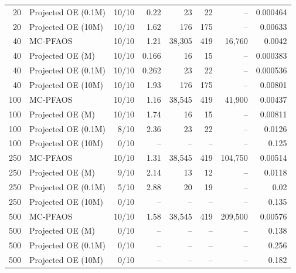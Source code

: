 \begin{table}[!htbp]
\begin{tabular}{r l r r r r r r}
20 & Projected OE (0.1M) & 10/10 & 0.22 & 23 & 22 & -- & 0.000464 \\
20 & Projected OE (10M) & 10/10 & 1.62 & 176 & 175 & -- & 0.00633 \\
\hline
40 & MC-PFAOS & 10/10 & 1.21 & 38,305 & 419 & 16,760 & 0.0042 \\
40 & Projected OE (M) & 10/10 & 0.166 & 16 & 15 & -- & 0.000383 \\
40 & Projected OE (0.1M) & 10/10 & 0.262 & 23 & 22 & -- & 0.000536 \\
40 & Projected OE (10M) & 10/10 & 1.93 & 176 & 175 & -- & 0.00801 \\
\hline
100 & MC-PFAOS & 10/10 & 1.16 & 38,545 & 419 & 41,900 & 0.00437 \\
100 & Projected OE (M) & 10/10 & 1.74 & 16 & 15 & -- & 0.00811 \\
100 & Projected OE (0.1M) & 8/10 & 2.36 & 23 & 22 & -- & 0.0126 \\
100 & Projected OE (10M) & 0/10 & -- & -- & -- & -- & 0.125 \\
\hline
250 & MC-PFAOS & 10/10 & 1.31 & 38,545 & 419 & 104,750 & 0.00514 \\
250 & Projected OE (M) & 9/10 & 2.14 & 13 & 12 & -- & 0.0118 \\
250 & Projected OE (0.1M) & 5/10 & 2.88 & 20 & 19 & -- & 0.02 \\
250 & Projected OE (10M) & 0/10 & -- & -- & -- & -- & 0.135 \\
\hline
500 & MC-PFAOS & 10/10 & 1.58 & 38,545 & 419 & 209,500 & 0.00576 \\
500 & Projected OE (M) & 0/10 & -- & -- & -- & -- & 0.138 \\
500 & Projected OE (0.1M) & 0/10 & -- & -- & -- & -- & 0.256 \\
500 & Projected OE (10M) & 0/10 & -- & -- & -- & -- & 0.182 \\
\hline
\end{tabular}
\end{table}
